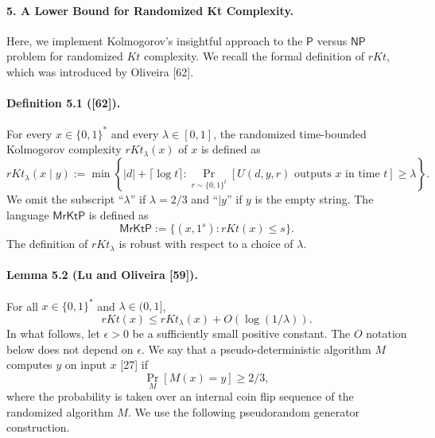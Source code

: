 \paragraph{5. A Lower Bound for Randomized Kt Complexity.}
Here, we implement Kolmogorov's insightful approach to the $\mathsf P$ versus $\mathsf{NP}$ problem for randomized $Kt$ complexity. We recall the formal definition of $rKt$, which was introduced by Oliveira [62].
\paragraph{Definition 5.1 ([62]).}
For every $x\in\{0,1\}^*$ and every $\lambda\in[0,1]$, the randomized time-bounded Kolmogorov complexity $rKt_\lambda(x)$ of $x$ is defined as
\[rKt_\lambda(x\mid y):=\min\left\{|d|+\lceil\log t\rceil:\Pr_{r\sim\{0,1\}^t}[U(d,y,r)\text{ outputs }x\text{ in time }t]\geq\lambda\right\}.\]
We omit the subscript ``$\lambda$'' if $\lambda=2/3$ and ``$\mid y$'' if $y$ is the empty string. The language $\mathsf{MrKtP}$ is defined as
\[\mathsf{MrKtP}:=\{(x,1^s):rKt(x)\leq s\}.\]
The definition of $rKt_\lambda$ is robust with respect to a choice of $\lambda$.
\paragraph{Lemma 5.2 (Lu and Oliveira [59]).}
For all $x\in\{0,1\}^*$ and $\lambda\in(0,1]$,
\[rKt(x)\leq rKt_\lambda(x)+O(\log(1/\lambda)).\]
In what follows, let $\epsilon>0$ be a sufficiently small positive constant. The $O$ notation below does not depend on $\epsilon$. We say that a pseudo-deterministic algorithm $M$ computes $y$ on input $x$ [27] if
\[\Pr_M[M(x)=y]\geq2/3,\]
where the probability is taken over an internal coin flip sequence of the randomized algorithm $M$. We use the following pseudorandom generator construction.
